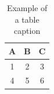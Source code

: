 \documentclass[12pt]{article}
\begin{document}
\begin{table}[h]
\centering
\begin{tabular}{|c|c|c|}
\hline
A & B & C \\ \hline
1 & 2 & 3 \\ \hline
4 & 5 & 6 \\ \hline
\end{tabular}
\caption{Example of a table caption}
\label{tab:example}
\end{table}
\end{document}
